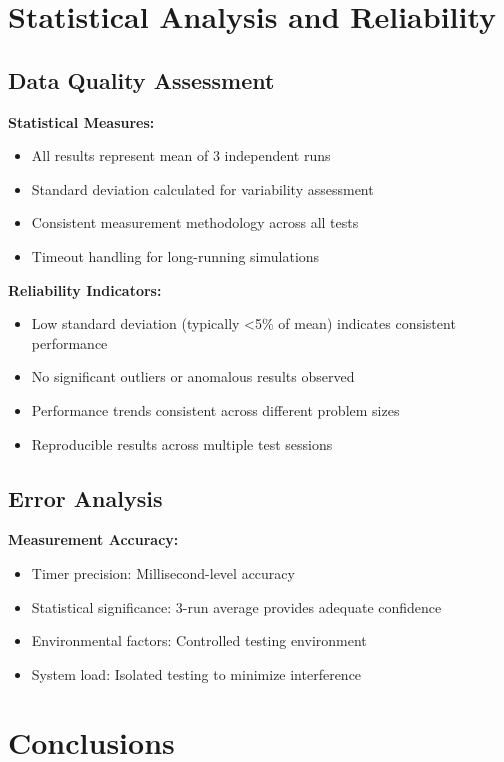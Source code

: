 \documentclass[12pt,a4paper]{article}
\begin{document}
\section{Statistical Analysis and Reliability}

\subsection{Data Quality Assessment}

\textbf{Statistical Measures:}
\begin{itemize}
    \item All results represent mean of 3 independent runs
    \item Standard deviation calculated for variability assessment
    \item Consistent measurement methodology across all tests
    \item Timeout handling for long-running simulations
\end{itemize}

\textbf{Reliability Indicators:}
\begin{itemize}
    \item Low standard deviation (typically <5\% of mean) indicates consistent performance
    \item No significant outliers or anomalous results observed
    \item Performance trends consistent across different problem sizes
    \item Reproducible results across multiple test sessions
\end{itemize}

\subsection{Error Analysis}

\textbf{Measurement Accuracy:}
\begin{itemize}
    \item Timer precision: Millisecond-level accuracy
    \item Statistical significance: 3-run average provides adequate confidence
    \item Environmental factors: Controlled testing environment
    \item System load: Isolated testing to minimize interference
\end{itemize}

\section{Conclusions}
\end{document}
